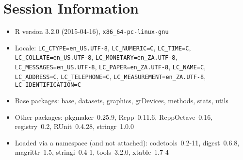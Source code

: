 \documentclass[10pt]{article}\usepackage[]{graphicx}\usepackage[]{color}
\begin{document}
\section*{Session Information}
\begin{itemize}\raggedright
  \item R version 3.2.0 (2015-04-16), \verb|x86_64-pc-linux-gnu|
  \item Locale: \verb|LC_CTYPE=en_US.UTF-8|, \verb|LC_NUMERIC=C|, \verb|LC_TIME=C|, \verb|LC_COLLATE=en_US.UTF-8|, \verb|LC_MONETARY=en_ZA.UTF-8|, \verb|LC_MESSAGES=en_US.UTF-8|, \verb|LC_PAPER=en_ZA.UTF-8|, \verb|LC_NAME=C|, \verb|LC_ADDRESS=C|, \verb|LC_TELEPHONE=C|, \verb|LC_MEASUREMENT=en_ZA.UTF-8|, \verb|LC_IDENTIFICATION=C|
  \item Base packages: base, datasets, graphics, grDevices, methods,
    stats, utils
  \item Other packages: pkgmaker~0.25.9, Rcpp~0.11.6, RcppOctave~0.16,
    registry~0.2, RUnit~0.4.28, stringr~1.0.0
  \item Loaded via a namespace (and not attached): codetools~0.2-11,
    digest~0.6.8, magrittr~1.5, stringi~0.4-1, tools~3.2.0,
    xtable~1.7-4
\end{itemize}
\end{document}
